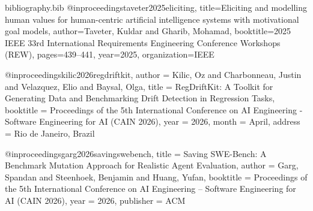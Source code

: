\begin{filecontents}{bibliography.bib}
@inproceedings{taveter2025eliciting,
  title={Eliciting and modelling human values for human-centric artificial intelligence systems with motivational goal models},
  author={Taveter, Kuldar and Gharib, Mohamad},
  booktitle={2025 IEEE 33rd International Requirements Engineering Conference Workshops (REW)},
  pages={439--441},
  year={2025},
  organization={IEEE}
}

@inproceedings{kilic2026regdriftkit,
  author    = {Kilic, Oz and Charbonneau, Justin and Velazquez, Elio and Baysal, Olga},
  title     = {{RegDriftKit}: A Toolkit for Generating Data and Benchmarking Drift Detection in Regression Tasks},
  booktitle = {Proceedings of the 5th International Conference on AI Engineering - Software Engineering for AI (CAIN 2026)},
  year      = {2026},
  month     = {April},
  address   = {Rio de Janeiro, Brazil}
}

@inproceedings{garg2026savingswebench,
  title     = {Saving SWE-Bench: A Benchmark Mutation Approach for Realistic Agent Evaluation},
  author    = {Garg, Spandan and Steenhoek, Benjamin and Huang, Yufan},
  booktitle = {Proceedings of the 5th International Conference on AI Engineering -- Software Engineering for AI (CAIN 2026)},
  year      = {2026},
  publisher = {ACM}
}


\end{filecontents}

\documentclass[11pt]{article}
 
\usepackage[margin=1in]{geometry} 
\usepackage{amsmath,amsthm,amssymb}
\usepackage{biblatex}

 
\newcommand{\N}{\mathbb{N}}
\newcommand{\Z}{\mathbb{Z}}
 

